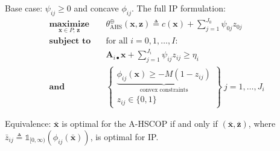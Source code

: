 \documentclass[aspectratio=169,xcolor=dvipsnames]{beamer}
\begin{document}
\begin{frame}
  \footnotesize
  \setlength{\abovedisplayskip}{4pt}
  \setlength{\belowdisplayskip}{4pt}

  {\color{MediumBlue}Base case}: $\psi_{ij}\geq 0$ and concave $\phi_{ij}$.
  The full IP formulation:
  \[
    \begin{aligned}
      \operatorname*{\textbf{maximize}}_{\mathbf{x}\in P;\,\mathbf{z}}\quad
      &\theta^{\oplus}_{\mathrm{AHS}}(\mathbf{x},\mathbf{z})\triangleq
        c(\mathbf{x})+\sum_{j=1}^{J_0}\psi_{0j}z_{0j}\\[2pt]
      \operatorname*{\textbf{subject to}}\quad
      &\text{for all }i=0,1,\ldots,I:\\[2pt]
      &\mathbf{A}_{i\bullet}\mathbf{x}
        +\sum_{j=1}^{J_i}\psi_{ij}z_{ij}\geq\eta_i\\[2pt]
      \textbf{and}\quad
      &\left\{
        \begin{array}{l}
          \underbrace{\phi_{ij}(\mathbf{x})\geq -M(1-z_{ij})}_{
            \text{convex constraints}}\\[8pt]
          z_{ij}\in\{0,1\}
        \end{array}\right\}\ j=1,\ldots,J_i
    \end{aligned}
  \]

  \vspace{0.06cm}
  {\color{MediumRed}Equivalence}: $\bar{\mathbf{x}}$ is optimal for the
  A-HSCOP if and only if $(\bar{\mathbf{x}},\bar{\mathbf{z}})$, where
  $\bar{z}_{ij}\triangleq\mathds{1}_{[0,\infty)}(\phi_{ij}(\bar{\mathbf{x}}))$,
  is optimal for IP.
\end{frame}
\end{document}
